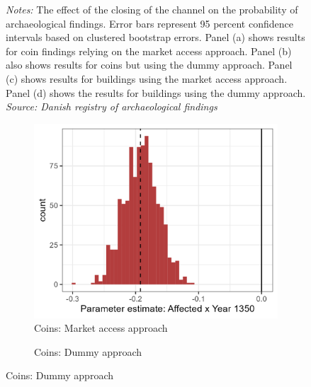 \documentclass[11pt]{article}
\begin{document}
\begin{figure}
\begin{subfigure}[b]{0.45\textwidth}
    \end{subfigure}
    \parbox{0.9\textwidth}{
    \caption*{\footnotesize \textit{Notes:} The effect of the closing of the channel on the probability of archaeological findings. Error bars represent 95 percent confidence intervals based on clustered bootstrap errors. Panel (a) shows results for coin findings relying on the market access approach. Panel (b) also shows results for coins but using the dummy approach. Panel (c) shows results for buildings using the market access approach. Panel (d) shows the results for buildings using the dummy approach.  \\ \textit{Source: Danish registry of archaeological findings}}
}    \label{fig:arch_reg}
\end{figure}


\begin{figure}
    \centering
    \caption{Distribution of parameter estimates in 1350}
    \begin{subfigure}[b]{0.45\textwidth}
        \centering
        \caption{Coins: Market access approach} \label{fig:distri_a}
        \includegraphics[width=\textwidth]{Plots/Regression_plots/arch_MA_coins_boot.png}
    \end{subfigure}
    \hfill
    \begin{subfigure}[b]{0.45\textwidth}
        \centering
        \caption{Coins: Dummy approach} \label{fig:distri_b}

\end{subfigure}
\end{figure}
\end{document}
